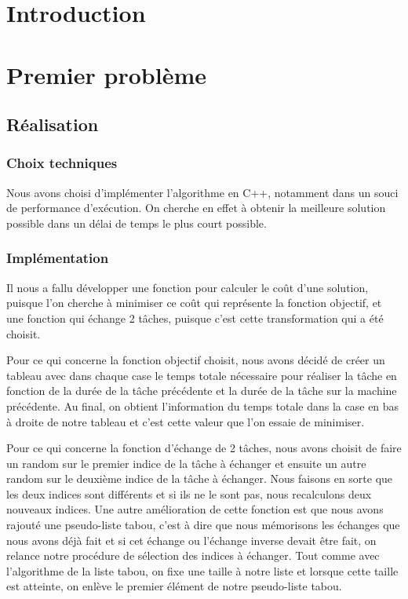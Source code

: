 \documentclass{report}
\begin{document}
\tableofcontents

\chapter{Introduction}
\minitoc

\newpage

\chapter{Premier problème}
\minitoc
\section{Réalisation}
\subsection{Choix techniques}
Nous avons choisi d'implémenter l'algorithme en C++, notamment dans un souci de performance d’exécution. On cherche en effet à obtenir la meilleure solution possible dans un délai de temps le plus court possible.

\subsection{Implémentation}
Il nous a fallu développer une fonction pour calculer le coût d'une solution, puisque l'on cherche à minimiser ce coût qui représente la fonction objectif, et une fonction qui échange 2 tâches, puisque c'est cette transformation qui a été choisit.

Pour ce qui concerne la fonction objectif choisit, nous avons décidé de créer un tableau avec dans chaque case le temps totale nécessaire pour réaliser la tâche en fonction de la durée de la tâche précédente et la durée de la tâche sur la machine précédente. Au final, on obtient l'information du temps totale dans la case en bas à droite de notre tableau et c'est cette valeur que l'on essaie de minimiser.

Pour ce qui concerne la fonction d'échange de 2 tâches, nous avons choisit de faire un random sur le premier indice de la tâche à échanger et ensuite un autre random sur le deuxième indice de la tâche à échanger. Nous faisons en sorte que les deux indices sont différents et si ils ne le sont pas, nous recalculons deux nouveaux indices. Une autre amélioration de cette fonction est que nous avons rajouté une pseudo-liste tabou, c'est à dire que nous mémorisons les échanges que nous avons déjà fait et si cet échange ou l'échange inverse devait être fait, on relance notre procédure de sélection des indices à échanger. Tout comme avec l'algorithme de la liste tabou, on fixe une taille à notre liste et lorsque cette taille est atteinte, on enlève le premier élément de notre pseudo-liste tabou.
\end{document}

